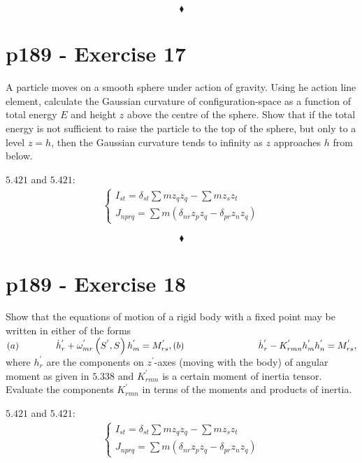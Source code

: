 $$\blacklozenge$$
\newpage

\section{p189 - Exercise 17}
\begin{tcolorbox}
A particle moves on a smooth sphere under action of gravity. Using he action line element, calculate the Gaussian curvature of configuration-space as a function of total energy $E$ and height $z$ above the centre of the sphere. Show that if the total energy is not sufficient to raise the particle to the top of the sphere, but only to a level $z=h$, then the Gaussian curvature tends to infinity as $z$ approaches $h$ from below.
\end{tcolorbox} 
$\mathbf{5.421}$ and $\mathbf{5.421}$:
\begin{align}
\left\{\begin{array}{l}
I_{st}= \delta_{st}\sum m z_q z_q - \sum m z_s z_t\\
J_{nprq} = \sum m \left( \delta_{nr} z_p z_q - \delta_{pr} z_n z_q \right)
\end{array}\right.
\end{align}

$$\blacklozenge$$
\newpage


\section{p189 - Exercise 18}
\begin{tcolorbox}
Show that the equations of motion of a rigid body with a fixed point may be written in either of the forms\\
$(a)\quad\quad\quad\quad \dot{h}^{'}_r+\omega^{'}_{mr}\left(S^{'},S^{}\right)h^{'}_m = M^{'}_{rs},\\
(b)\quad\quad\quad\quad  \quad\quad\quad\quad \dot{h}^{'}_r-K^{'}_{rmn}h^{'}_m h^{'}_n= M^{'}_{rs},$\\
where $h^{'}_r$ are the components on $z^{'}$-axes (moving with the body) of angular moment as given in $\mathbf{5.338}$ and $K^{'}_{rmn}$ is a certain moment of inertia tensor. Evaluate the components  $K^{'}_{rmn}$ in terms of the moments and products of inertia.
\end{tcolorbox} 
$\mathbf{5.421}$ and $\mathbf{5.421}$:
\begin{align}
\left\{\begin{array}{l}
I_{st}= \delta_{st}\sum m z_q z_q - \sum m z_s z_t\\
J_{nprq} = \sum m \left( \delta_{nr} z_p z_q - \delta_{pr} z_n z_q \right)
\end{array}\right.
\end{align}

